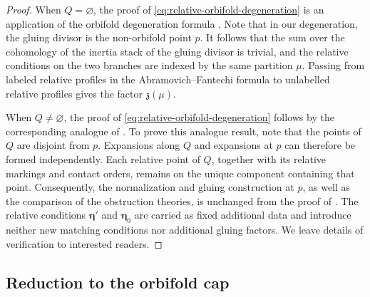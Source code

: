 \documentclass[letterpaper,12pt]{amsart}
\theoremstyle{definition}
\numberwithin{equation}{section}
\begin{document}
\begin{proof}

When \(Q=\varnothing\), the proof of
\eqref{eq:relative-orbifold-degeneration} is an application of the orbifold
degeneration formula \cite[Theorem~5.9]{AF}. Note that in our degeneration, the
gluing divisor is the non-orbifold point \(p\). It follows that the sum
over the cohomology of the inertia stack of the gluing divisor is
trivial, and the relative conditions on the two branches are indexed
by the same partition \(\mu\). Passing from labeled relative profiles in the Abramovich--Fantechi
formula to unlabelled relative profiles gives the factor
\(\mathfrak z(\mu)\).

When $Q\ne\varnothing$, the proof of
\eqref{eq:relative-orbifold-degeneration} follows by the corresponding analogue of \cite[Theorem~5.9]{AF}. To prove this analogue result, note that the points of \(Q\) are disjoint from $p$. Expansions along
\(Q\) and expansions at $p$ can therefore be formed
independently.  Each relative point of \(Q\), together with its relative
markings and contact orders, remains on the unique component containing
that point. Consequently, the normalization and gluing construction at \(p\), as
well as the comparison of the obstruction theories, is unchanged from
the proof of \cite[Theorem~5.9]{AF}.  The relative conditions
\(\boldsymbol\eta'\) and \(\boldsymbol\eta_0\) are carried as fixed
additional data and introduce neither new matching conditions nor
additional gluing factors. We leave details of verification to interested readers.
\end{proof}

\subsection{Reduction to the orbifold cap}


\end{document}
